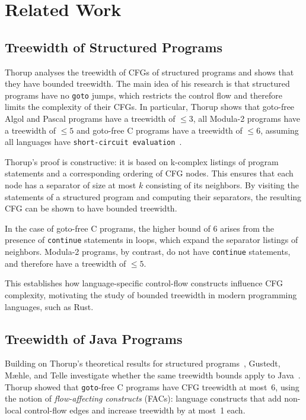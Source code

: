 \section{Related Work}
\label{sec:related-work}

\subsection{Treewidth of Structured Programs}
\label{subsec:rw-treewidth-structured}
Thorup analyses the treewidth of CFGs of structured programs and shows that they have bounded treewidth.
The main idea of his research is that structured programs have no \texttt{goto} jumps, which restricts the control flow and therefore limits the complexity of their CFGs.
In particular, Thorup shows that goto-free Algol and Pascal programs have a treewidth of $\leq3$, all Modula-2 programs have a treewidth of $\leq5$ and goto-free C programs have a treewidth of $\leq6$, assuming all languages have \texttt{short-circuit evaluation}~\cite{thorup_1998}.

Thorup's proof is constructive: it is based on k-complex listings of program statements and a corresponding ordering of CFG nodes.
This ensures that each node has a separator of size at most $k$ consisting of its neighbors.
By visiting the statements of a structured program and computing their separators, the resulting CFG can be shown to have bounded treewidth.

In the case of goto-free C programs, the higher bound of 6 arises from the presence of \texttt{continue} statements in loops, which expand the separator listings of neighbors.
Modula-2 programs, by contrast, do not have \texttt{continue} statements, and therefore have a treewidth of $\leq5$.

This establishes how language-specific control-flow constructs influence CFG complexity, motivating the study of bounded treewidth in modern programming languages, such as Rust.

\subsection{Treewidth of Java Programs}
\label{subsec:rw-java}

Building on Thorup's theoretical results for structured programs~\cite{thorup_1998}, Gustedt, M{\ae}hle, and Telle investigate whether the same treewidth bounds apply to Java~\cite{gustedt_2002}.
Thorup showed that \texttt{goto}-free C programs have CFG treewidth at most~6, using the notion of \emph{flow-affecting constructs} (FACs): language constructs that add non-local control-flow edges and increase treewidth by at most~1 each.

